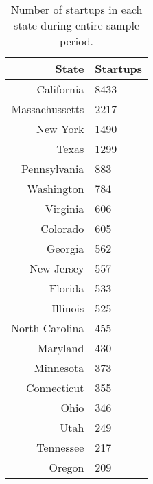 \begin{table}[!htb]
\centering
\begingroup\small
\begin{tabular}{rl}
  \toprule
State & Startups \\ 
  \midrule
California & 8433 \\ 
  Massachussetts & 2217 \\ 
  New York & 1490 \\ 
  Texas & 1299 \\ 
  Pennsylvania & 883 \\ 
  Washington & 784 \\ 
  Virginia & 606 \\ 
  Colorado & 605 \\ 
  Georgia & 562 \\ 
  New Jersey & 557 \\ 
  Florida & 533 \\ 
  Illinois & 525 \\ 
  North Carolina & 455 \\ 
  Maryland & 430 \\ 
  Minnesota & 373 \\ 
  Connecticut & 355 \\ 
  Ohio & 346 \\ 
  Utah & 249 \\ 
  Tennessee & 217 \\ 
  Oregon & 209 \\ 
   \bottomrule
\end{tabular}
\endgroup
\caption{Number of startups in each state during entire sample period.} 
\end{table}
